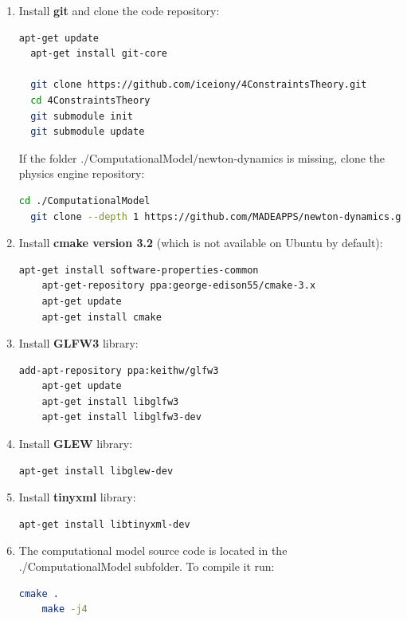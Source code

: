\documentclass[11]{article}
\begin{document}
\begin{enumerate}
  \item Install \textbf{git} and clone the code repository: 
    \begin{lstlisting}[language=bash]
  apt-get update
  apt-get install git-core

  git clone https://github.com/iceiony/4ConstraintsTheory.git 
  cd 4ConstraintsTheory
  git submodule init
  git submodule update
    \end{lstlisting}

    If the folder ./ComputationalModel/newton-dynamics is missing, clone the physics engine repository:
    \begin{lstlisting}[language=bash]
  cd ./ComputationalModel
  git clone --depth 1 https://github.com/MADEAPPS/newton-dynamics.git 
    \end{lstlisting}

  \item Install \textbf{cmake version 3.2} (which is not available on Ubuntu by default): 
    \begin{lstlisting}[language=bash]
    apt-get install software-properties-common
    apt-get-repository ppa:george-edison55/cmake-3.x
    apt-get update
    apt-get install cmake
    \end{lstlisting}

  \item Install \textbf{GLFW3} library:
    \begin{lstlisting}[language=bash]
    add-apt-repository ppa:keithw/glfw3
    apt-get update
    apt-get install libglfw3
    apt-get install libglfw3-dev
    \end{lstlisting}

  \item Install \textbf{GLEW} library:
    \begin{lstlisting}[language=bash]
    apt-get install libglew-dev
    \end{lstlisting}
    

  \item Install \textbf{tinyxml} library:
    \begin{lstlisting}[language=bash]
    apt-get install libtinyxml-dev
    \end{lstlisting}
    
  \item The computational model source code is located in the ./ComputationalModel subfolder. To compile it run:
    \begin{lstlisting}[language=bash]
    cmake .
    make -j4
    \end{lstlisting}
\end{enumerate}
\end{document}
